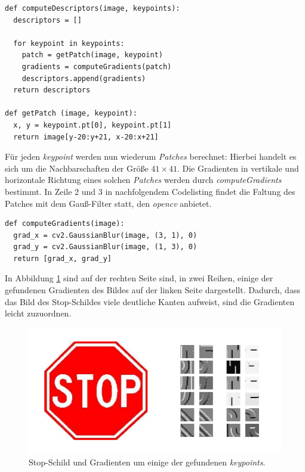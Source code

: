 \begin{lstlisting}[style=Python]
def computeDescriptors(image, keypoints):
  descriptors = []
  
  for keypoint in keypoints:
  	patch = getPatch(image, keypoint)
  	gradients = computeGradients(patch)
  	descriptors.append(gradients)
  return descriptors
  
def getPatch (image, keypoint):
  x, y = keypoint.pt[0], keypoint.pt[1]
  return image[y-20:y+21, x-20:x+21]
\end{lstlisting}

Für jeden \textit{keypoint} werden nun wiederum \textit{Patches} berechnet: Hierbei handelt es sich um die Nachbarschaften der Größe $41 \times 41$. Die Gradienten in vertikale und horizontale Richtung eines solchen \textit{Patches} werden durch \textit{computeGradients} bestimmt. In Zeile 2 und 3 in nachfolgendem Codelisting findet die Faltung des Patches mit dem Gauß-Filter statt, den \textit{opencv} anbietet.

\begin{lstlisting}[style=Python]
def computeGradients(image):
  grad_x = cv2.GaussianBlur(image, (3, 1), 0)
  grad_y = cv2.GaussianBlur(image, (1, 3), 0)
  return [grad_x, grad_y]
\end{lstlisting}

In Abbildung \ref{img:gradients} sind auf der rechten Seite sind, in zwei Reihen, einige der gefundenen Gradienten des Bildes auf der linken Seite dargestellt. Dadurch, dass das Bild des Stop-Schildes viele deutliche Kanten aufweist, sind die Gradienten leicht zuzuordnen.

\begin{figure}
	\centering
	\includegraphics[scale=0.65]{images/gradients_patch.png}
	\caption[Stop-Schild und Gradienten um einige der gefundenen \textit{keypoints}]{Stop-Schild und Gradienten um einige der gefundenen \textit{keypoints}\footnotemark .}
	\label{img:gradients}
\end{figure}

